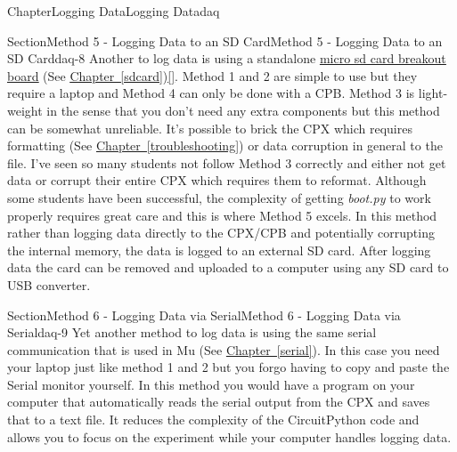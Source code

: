 \documentclass[oneside,10pt,]{book}
\newcommand{\xreffont}{\relax}
\newcommand{\linkhilite}[1]{\underline{#1}}
\numberwithin{equation}{section}
\begin{document}
\begin{chapterptx}{Chapter}{Logging Data}{}{Logging Data}{}{}{daq}
\typeout{************************************************}
%
\begin{sectionptx}{Section}{Method 5 - Logging Data to an SD Card}{}{Method 5 - Logging Data to an SD Card}{}{}{daq-8}
Another to log data is using a standalone \href{https://www.adafruit.com/product/254}{\linkhilite{micro sd card breakout board}} (See \hyperref[sdcard]{\linkhilite{Chapter~{\xreffont\ref{sdcard}}}})\hyperlink{AdafruitMAIN}{\linkhilite{[{\xreffont 34}]}}. Method 1 and 2 are simple to use but they require a laptop and Method 4 can only be done with a CPB. Method 3 is light-weight in the sense that you don't need any extra components but this method can be somewhat unreliable. It's possible to brick the CPX which requires formatting (See \hyperref[troubleshooting]{\linkhilite{Chapter~{\xreffont\ref{troubleshooting}}}}) or data corruption in general to the file. I've seen so many students not follow Method 3 correctly and either not get data or corrupt their entire CPX which requires them to reformat. Although some students have been successful, the complexity of getting \emph{boot.py} to work properly requires great care and this is where Method 5 excels. In this method rather than logging data directly to the CPX\slash{}CPB and potentially corrupting the internal memory, the data is logged to an external SD card. After logging data the card can be removed and uploaded to a computer using any SD card to USB converter.%
\end{sectionptx}
%
%
\typeout{************************************************}
\typeout{************************************************}
%
\begin{sectionptx}{Section}{Method 6 - Logging Data via Serial}{}{Method 6 - Logging Data via Serial}{}{}{daq-9}
Yet another method to log data is using the same serial communication that is used in Mu (See \hyperref[serial]{\linkhilite{Chapter~{\xreffont\ref{serial}}}}). In this case you need your laptop just like method 1 and 2 but you forgo having to copy and paste the Serial monitor yourself. In this method you would have a program on your computer that automatically reads the serial output from the CPX and saves that to a text file. It reduces the complexity of the CircuitPython code and allows you to focus on the experiment while your computer handles logging data.%
\end{sectionptx}
%
%
\typeout{************************************************}

\end{chapterptx}
\end{document}
